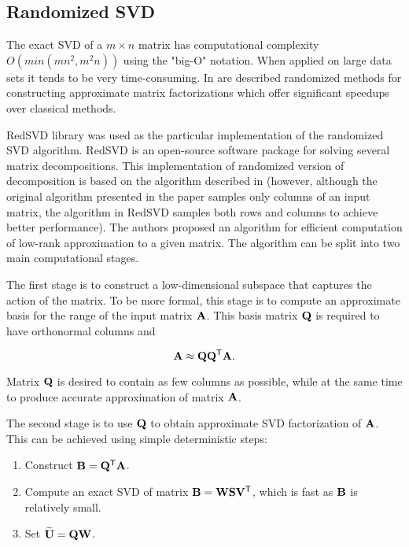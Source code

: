 \subsection{Randomized SVD}

The exact SVD of a $m \times n$ matrix has computational complexity \newline $O(min(mn^2, m^2n))$ using the "big-O" notation. When applied on large data sets it tends to be very time-consuming. In \cite{Candes2011, Woolfe2008, Martinsson2011, Szlam2014} are described randomized methods for constructing approximate matrix factorizations which offer significant speedups over classical methods.

RedSVD library was used as the particular implementation of the randomized SVD algorithm. RedSVD is an open-source software package for solving several matrix decompositions. This implementation of randomized version of decomposition is based on the algorithm described in \cite{Halko2011} (however, although the original algorithm presented in the paper samples only columns of an input matrix, the algorithm in RedSVD samples both rows and columns to achieve better performance). The authors proposed an algorithm for efficient computation of low-rank approximation to a given matrix. The algorithm can be split into two main computational stages.

The first stage is to construct a low-dimensional subspace that captures the action of the matrix. To be more formal, this stage is to compute an approximate basis for the range of the input matrix $\mathbf{A}$. This basis matrix $\mathbf{Q}$ is required to have orthonormal columns and

\begin{equation}
\mathbf{A} \approx \mathbf{Q} \mathbf{Q}^{\mathsf{T}} \mathbf{A}.
\end{equation}

\noindent
Matrix $\mathbf{Q}$ is desired to contain as few columns as possible, while at the same time to produce accurate approximation of matrix $\mathbf{A}$.

The second stage is to use $\mathbf{Q}$ to obtain approximate SVD factorization of $\mathbf{A}$. This can be achieved using simple deterministic steps:

\begin{enumerate}
\item Construct $\mathbf{B} = \mathbf{Q}^{\mathsf{T}} \mathbf{A}$.
\item Compute an exact SVD of matrix $\mathbf{B}=\mathbf{W}\mathbf{S}\mathbf{V}^{\mathsf{T}}$, which is fast as $\mathbf{B}$ is relatively small.
\item Set $\mathbf{\widetilde{U}}=\mathbf{Q}\mathbf{W}$.
\end{enumerate}

